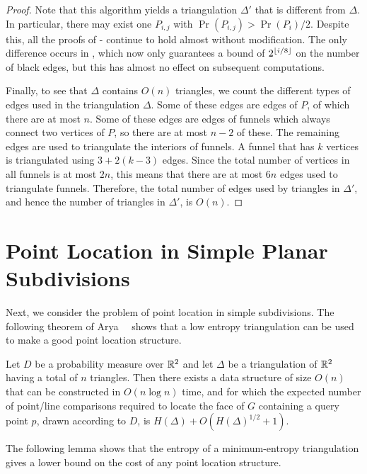 \documentclass[lotsofwhite]{patmorin}
\begin{document}
\begin{proof}
Note that this algorithm yields a triangulation $\Delta'$ that is
different from $\Delta$.  In particular, there may exist one $P_{i,j}$
with $\Pr(P_{i,j})>\Pr(P_i)/2$.  Despite this, all the proofs of
- continue to hold almost without modification.
The only difference occurs in , which now only
guarantees a bound of $2^{\left\lfloor i/8 \right\rfloor}$ on the number of black edges,
but this has almost no effect on subsequent computations.

Finally, to see that $\Delta$ contains $O(n)$ triangles, we count the
different types of edges used in the triangulation $\Delta$.  Some of
these edges are edges of $P$, of which there are at most $n$.  Some of
these edges are edges of funnels which always connect two vertices of
$P$, so there are at most $n-2$ of these.  The remaining edges are
used to triangulate the interiors of funnels.  A funnel that has $k$
vertices is triangulated using $3 + 2(k-3)$ edges.  Since the total
number of vertices in all funnels is at most $2n$, this means that
there are at most $6n$ edges used to triangulate funnels.  Therefore,
the total number of edges used by triangles in $\Delta'$, and hence
the number of triangles in $\Delta'$,
is $O(n)$.
\end{proof}

\section{Point Location in Simple Planar Subdivisions}

Next, we consider the problem of point location in simple
subdivisions.  The following theorem of Arya~\etal~\cite{ammw07}
shows that a low entropy triangulation can be used to make a good
point location structure.

\begin{thm}
Let $D$ be a probability measure over $\mathbb{R}^2$ and let $\Delta$ be a
triangulation of $\mathbb{R}^2$ having a total of $n$ triangles.  Then there exists a
data structure of size $O(n)$ that can be constructed in $O(n\log n)$
time, and for which the expected number of point/line comparisons
required to locate the face of $G$ containing a query point $p$, drawn
according to $D$, is $H(\Delta) + O(H(\Delta)^{1/2}+1)$.
\end{thm}

The following lemma shows that the entropy of a minimum-entropy
triangulation gives a lower bound on the cost of any point location
structure.
\end{document}
